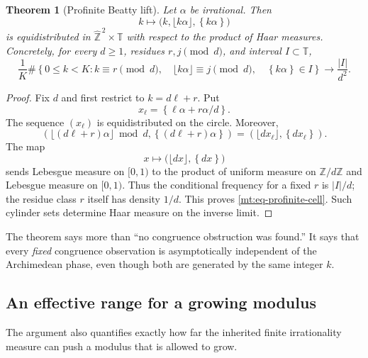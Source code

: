 \documentclass[11pt,oneside]{article}
\newtheorem{theorem}{Theorem}[section]
\theoremstyle{definition}
\theoremstyle{remark}
\newcommand{\Z}{\mathbb Z}
\newcommand{\Torus}{\mathbb T}
\newcommand{\fract}[1]{\left\{#1\right\}}
\begin{document}
\begin{theorem}[Profinite Beatty lift]
\label{mt:thm-profinite-beatty}
Let $\alpha$ be irrational.  Then
\begin{equation}
 k\longmapsto
 \bigl(k,\lfloor k\alpha\rfloor,\fract{k\alpha}\bigr)
 \label{mt:eq-profinite-sequence}
\end{equation}
is equidistributed in
$\widehat{\Z}^{\,2}\times\Torus$ with respect to the product of Haar measures.  Concretely,
for every $d\ge1$, residues $r,j\pmod d$, and interval $I\subset\Torus$,
\begin{equation}
 \frac1K\#\left\{0\le k<K:
  k\equiv r\pmod d,\quad
  \lfloor k\alpha\rfloor\equiv j\pmod d,\quad
  \fract{k\alpha}\in I
 \right\}
 \longrightarrow \frac{|I|}{d^2}.
 \label{mt:eq-profinite-cell}
\end{equation}
\end{theorem}

\begin{proof}
Fix $d$ and first restrict to $k=d\ell+r$.  Put
\[
 x_\ell=\fract{\ell\alpha+r\alpha/d}.
\]
The sequence $(x_\ell)$ is equidistributed on the circle.  Moreover,
\begin{equation}
 \left(\lfloor(d\ell+r)\alpha\rfloor\bmod d,
       \fract{(d\ell+r)\alpha}\right)
 =\left(\lfloor d x_\ell\rfloor,\fract{d x_\ell}\right).
 \label{mt:eq-digit-phase-map}
\end{equation}
The map
\[
 x\longmapsto\bigl(\lfloor dx\rfloor,\fract{dx}\bigr)
\]
sends Lebesgue measure on $[0,1)$ to the product of uniform measure on
$\Z/d\Z$ and Lebesgue measure on $[0,1)$.  Thus the conditional frequency for a fixed $r$ is
$|I|/d$; the residue class $r$ itself has density $1/d$.  This proves
\eqref{mt:eq-profinite-cell}.  Such cylinder sets determine Haar measure on the inverse limit.
\end{proof}

The theorem says more than ``no congruence obstruction was found.''  It says that every
\emph{fixed} congruence observation is asymptotically independent of the Archimedean phase,
even though both are generated by the same integer $k$.

\subsection{An effective range for a growing modulus}

The argument also quantifies exactly how far the inherited finite irrationality measure can
push a modulus that is allowed to grow.
\end{document}
